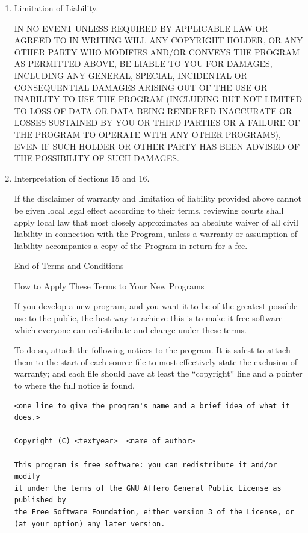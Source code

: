 \documentclass[a4paper,twocolumn]{article}
\begin{document}
\begin{enumerate}
\item Limitation of Liability.

 IN NO EVENT UNLESS REQUIRED BY APPLICABLE LAW OR AGREED TO IN
 WRITING WILL ANY COPYRIGHT HOLDER, OR ANY OTHER PARTY WHO MODIFIES
 AND/OR CONVEYS THE PROGRAM AS PERMITTED ABOVE, BE LIABLE TO YOU FOR
 DAMAGES, INCLUDING ANY GENERAL, SPECIAL, INCIDENTAL OR CONSEQUENTIAL
 DAMAGES ARISING OUT OF THE USE OR INABILITY TO USE THE PROGRAM
 (INCLUDING BUT NOT LIMITED TO LOSS OF DATA OR DATA BEING RENDERED
 INACCURATE OR LOSSES SUSTAINED BY YOU OR THIRD PARTIES OR A FAILURE
 OF THE PROGRAM TO OPERATE WITH ANY OTHER PROGRAMS), EVEN IF SUCH
 HOLDER OR OTHER PARTY HAS BEEN ADVISED OF THE POSSIBILITY OF SUCH
 DAMAGES.

\item Interpretation of Sections 15 and 16.

If the disclaimer of warranty and limitation of liability provided
above cannot be given local legal effect according to their terms,
reviewing courts shall apply local law that most closely approximates
an absolute waiver of all civil liability in connection with the
Program, unless a warranty or assumption of liability accompanies a
copy of the Program in return for a fee.

\begin{center}
{\Large\sc End of Terms and Conditions}

\bigskip
How to Apply These Terms to Your New Programs
\end{center}

If you develop a new program, and you want it to be of the greatest
possible use to the public, the best way to achieve this is to make it
free software which everyone can redistribute and change under these terms.

To do so, attach the following notices to the program.  It is safest
to attach them to the start of each source file to most effectively
state the exclusion of warranty; and each file should have at least
the ``copyright'' line and a pointer to where the full notice is found.

{\footnotesize
\begin{verbatim}
<one line to give the program's name and a brief idea of what it does.>

Copyright (C) <textyear>  <name of author>

This program is free software: you can redistribute it and/or modify
it under the terms of the GNU Affero General Public License as published by
the Free Software Foundation, either version 3 of the License, or
(at your option) any later version.


\end{verbatim}}
\end{enumerate}
\end{document}
